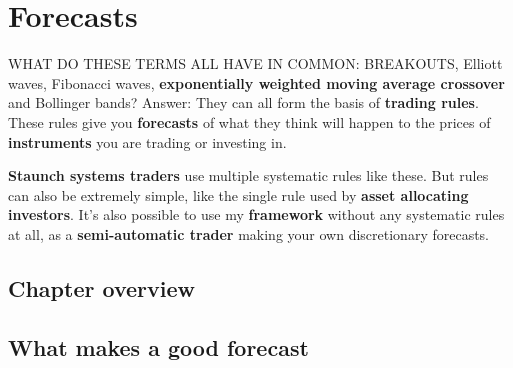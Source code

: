 \chapter{Forecasts}

WHAT DO THESE TERMS ALL HAVE IN COMMON: BREAKOUTS, Elliott waves, Fibonacci waves, \textbf{exponentially weighted moving average crossover} and Bollinger bands? Answer: They can all form the basis of \textbf{trading rules}. These rules give you \textbf{forecasts} of what they think will happen to the prices of \textbf{instruments} you are trading or investing in.

\textbf{Staunch systems traders} use multiple systematic rules like these. But rules can also be extremely simple, like the single rule used by \textbf{asset allocating investors}. It's also possible to use my \textbf{framework} without any systematic rules at all, as a \textbf{semi-automatic trader} making your own discretionary forecasts.

\section*{Chapter overview}  {}

\begin{chapteroverviewtable}
\end{chapteroverviewtable}

\section*{What makes a good forecast}  {}

